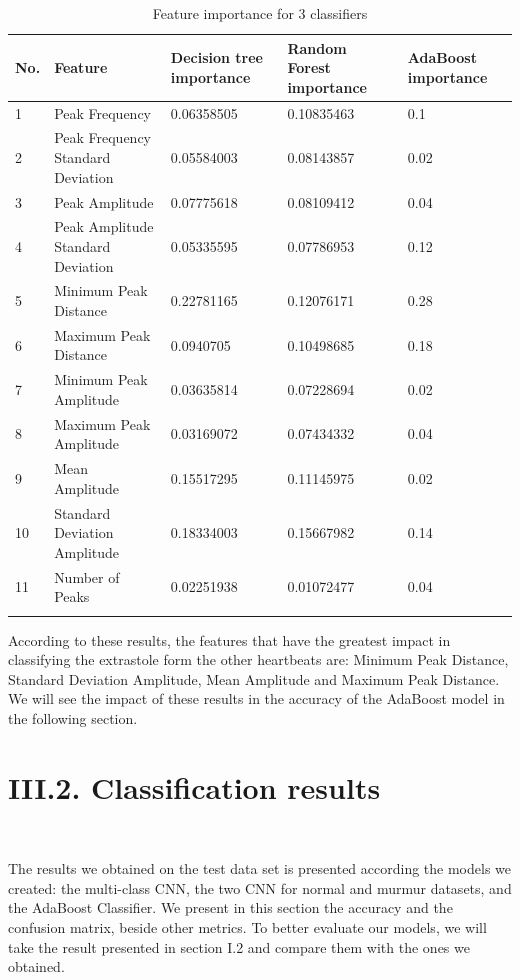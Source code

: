\documentclass[11pt, a4papper]{report}
\theoremstyle{plain}
\theoremstyle{definition}
\theoremstyle{definition}
\theoremstyle{proposition}
\begin{document}
\begin{longtable}[!h]{ | m{0.6cm} | m{3.3cm} || m{2.3cm} | m{2.3cm} | m{2.3cm} | } 
\hline
No. & Feature & Decision tree importance & Random Forest importance & AdaBoost importance \\ 
\hline\hline
1 & Peak Frequency & 0.06358505 & 0.10835463 & 0.1 \\ 
\hline
2 & Peak Frequency Standard Deviation & 0.05584003 & 0.08143857 & 0.02 \\ 
\hline
3 & Peak Amplitude & 0.07775618 & 0.08109412 & 0.04 \\ 
\hline
4 & Peak Amplitude Standard Deviation & 0.05335595 & 0.07786953 & 0.12 \\ 
\hline
5 & Minimum Peak Distance & 0.22781165 & 0.12076171 & 0.28 \\ 
\hline
6 & Maximum Peak Distance & 0.0940705 & 0.10498685 & 0.18 \\ 
\hline
7 & Minimum Peak Amplitude & 0.03635814 & 0.07228694 & 0.02 \\ 
\hline
8 & Maximum Peak Amplitude & 0.03169072 & 0.07434332 & 0.04 \\ 
\hline
9 & Mean Amplitude & 0.15517295 & 0.11145975 & 0.02 \\ 
\hline
10 & Standard Deviation Amplitude & 0.18334003 & 0.15667982 & 0.14 \\ 
\hline
11 & Number of Peaks & 0.02251938 & 0.01072477 & 0.04 \\ 
\hline

\caption{Feature importance for 3 classifiers}
\end{longtable}


According to these results, the features that have the greatest impact in classifying the extrastole form the other heartbeats are: Minimum Peak Distance, Standard Deviation Amplitude, Mean Amplitude and Maximum Peak Distance.
\\

We will see the impact of these results in the accuracy of the AdaBoost model in the following section.
\\

\section*{III.2. Classification results}

\

The results we obtained on the test data set is presented according the models we created: the multi-class CNN, the two CNN for normal and murmur datasets, and the AdaBoost Classifier. We present in this section the accuracy and the confusion matrix, beside other metrics. To better evaluate our models, we will take the result presented in section I.2 and compare them with the ones we obtained.
\\
\end{document}
